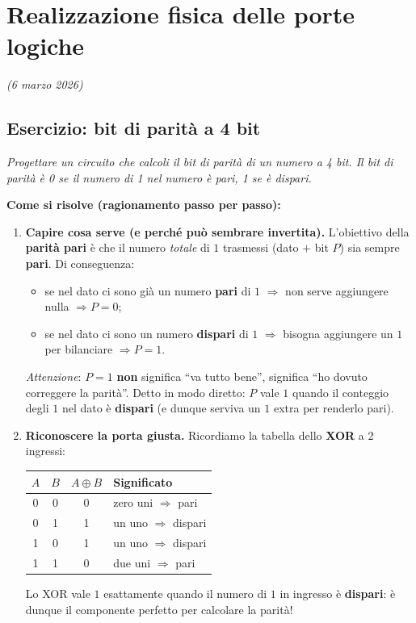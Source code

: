 \chapter{Realizzazione fisica delle porte logiche}
\label{ch:porte-logiche}
\textit{(6 marzo 2026)}

\section{Esercizio: bit di parità a 4 bit}

\textit{Progettare un circuito che calcoli il bit di parità di un numero a 4 bit. Il bit di parità è 0 se il numero di 1 nel numero è pari, 1 se è dispari.}

\medskip
\noindent\textbf{Come si risolve (ragionamento passo per passo):}

\begin{enumerate}[leftmargin=1.5em]
    \item \textbf{Capire cosa serve (e perché può sembrare invertita).}
    L'obiettivo della \textbf{parità pari} è che il numero \emph{totale} di $1$ trasmessi (dato $+$ bit $P$) sia sempre \textbf{pari}. Di conseguenza:
    \begin{itemize}
        \item se nel dato ci sono già un numero \textbf{pari} di $1$ $\Rightarrow$ non serve aggiungere nulla $\Rightarrow P = 0$;
        \item se nel dato ci sono un numero \textbf{dispari} di $1$ $\Rightarrow$ bisogna aggiungere un $1$ per bilanciare $\Rightarrow P = 1$.
    \end{itemize}
    \textit{Attenzione}: $P = 1$ \textbf{non} significa ``va tutto bene'', significa ``ho dovuto correggere la parità''. Detto in modo diretto: $P$ vale $1$ quando il conteggio degli $1$ nel dato è \textbf{dispari} (e dunque serviva un $1$ extra per renderlo pari).

    \item \textbf{Riconoscere la porta giusta.} Ricordiamo la tabella dello \textbf{XOR} a 2 ingressi:
    \begin{center}
    \begin{tabular}{cc|c|l}
    \toprule
    $A$ & $B$ & $A \oplus B$ & Significato \\
    \midrule
    0 & 0 & 0 & zero uni $\Rightarrow$ pari \\
    0 & 1 & 1 & un uno $\Rightarrow$ dispari \\
    1 & 0 & 1 & un uno $\Rightarrow$ dispari \\
    1 & 1 & 0 & due uni $\Rightarrow$ pari \\
    \bottomrule
    \end{tabular}
    \end{center}
    Lo XOR vale $1$ esattamente quando il numero di $1$ in ingresso è \textbf{dispari}: è dunque il componente perfetto per calcolare la parità!


\end{enumerate}
